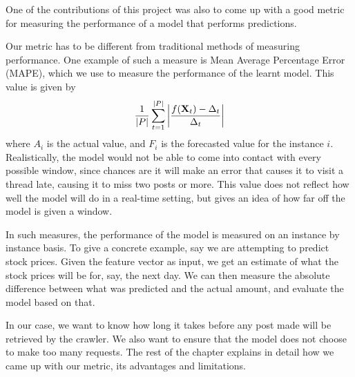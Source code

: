 One of the contributions of this project was also to come up with a good metric 
for measuring the performance of a model that performs predictions. 


Our metric has to be different from traditional methods of measuring 
performance. One example of such a measure is Mean Average Percentage Error 
(MAPE), which we use to measure the performance of the learnt model. This value 
is given by
\[
	\frac{1}{|P|}\sum^{|P|}_{t=1}\left|\frac{f(\mathbf{X}_t) - \Delta_t}{\Delta_t}\right|
\]
where $A_i$ is the actual value, and $F_i$ is the forecasted value for the 
instance $i$. Realistically, the model would not be able to come into contact 
with every possible window, 
since chances are it will make an error that causes 
it to visit a thread late, causing it to miss two posts or more. This value does 
not reflect how well the model will do in a real-time setting, but gives an idea 
of how far off the model is given a window.

In such measures, the performance of the model is measured on an instance by 
instance basis. 
To give a concrete example, say we are attempting to predict 
stock prices. Given the feature vector as input, we get an estimate of what the 
stock prices will be for, say, the next day. We can then measure the absolute 
difference between what was predicted and the actual amount, and evaluate the 
model based on that.

In our case, we want to know how long it takes before any post made will be 
retrieved by the crawler. We also want to ensure that the model does not choose 
to make too many requests. The rest of the chapter explains in detail how we 
came up with our metric, its advantages and limitations.



